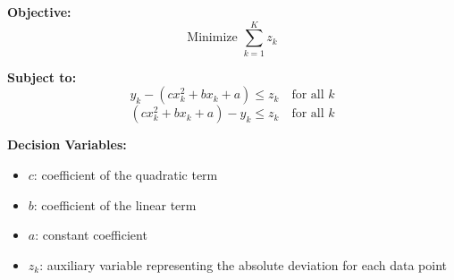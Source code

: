 \documentclass{article}
\begin{document}
\textbf{Objective:}
\[
\text{Minimize } \sum_{k=1}^{K} z_k
\]

\textbf{Subject to:}
\[
y_k - (c x_k^2 + b x_k + a) \leq z_k \quad \text{for all } k
\]
\[
(c x_k^2 + b x_k + a) - y_k \leq z_k \quad \text{for all } k
\]

\textbf{Decision Variables:}
\begin{itemize}
    \item \( c \): coefficient of the quadratic term
    \item \( b \): coefficient of the linear term
    \item \( a \): constant coefficient
    \item \( z_k \): auxiliary variable representing the absolute deviation for each data point
\end{itemize}
\end{document}
